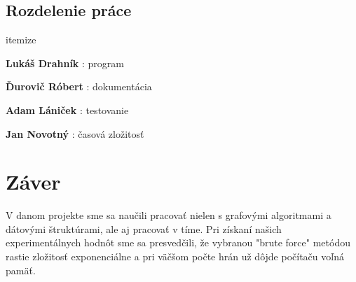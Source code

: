 \documentclass[a4paper,11pt, titlepage]{article}
\begin{document}
\subsection{Rozdelenie práce}

\begin{labeling}{itemize}
	\item [\textbf{Lukáš Drahník}] : program
	\item [\textbf{Ďurovič Róbert}] : dokumentácia
	\item [\textbf{Adam Lániček}] : testovanie
	\item [\textbf{Jan Novotný}] : časová zložitosť
\end{labeling}

\section{Záver}

V danom projekte sme sa naučili pracovať nielen s grafovými algoritmami a dátovými štruktúrami, ale aj pracovať v tíme. Pri získaní našich experimentálnych hodnôt sme sa presvedčili, že vybranou "brute force" metódou rastie zložitosť exponenciálne a pri väčšom počte hrán už dôjde počítaču voľná pamäť.

\newpage






		
\end{document}
